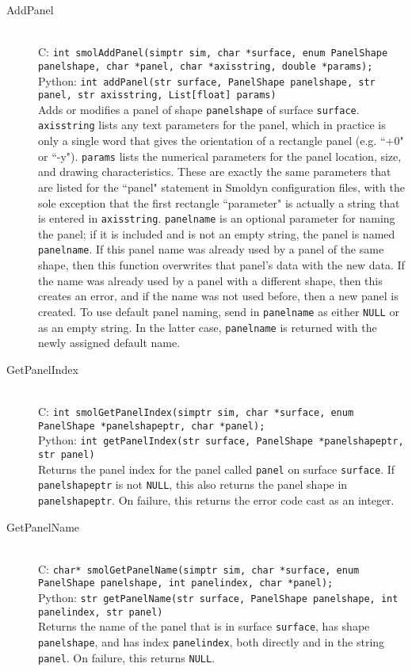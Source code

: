 \documentclass {book}
\begin{document}
\begin{description}
\item[AddPanel]
\hfill \\
C: \texttt{int smolAddPanel(simptr sim, char *surface, enum PanelShape panelshape, char *panel, char *axisstring, double *params);}\\
Python: \texttt{int addPanel(str surface, PanelShape panelshape, str panel, str axisstring, List[float] params)}\\
Adds or modifies a panel of shape \texttt{panelshape} of surface \texttt{surface}. \texttt{axisstring} lists any text parameters for the panel, which in practice is only a single word that gives the orientation of a rectangle panel (e.g. ``+0" or ``-y"). \texttt{params} lists the numerical parameters for the panel location, size, and drawing characteristics. These are exactly the same parameters that are listed for the ``panel" statement in Smoldyn configuration files, with the sole exception that the first rectangle ``parameter" is actually a string that is entered in \texttt{axisstring}. \texttt{panelname} is an optional parameter for naming the panel; if it is included and is not an empty string, the panel is named \texttt{panelname}. If this panel name was already used by a panel of the same shape, then this function overwrites that panel's data with the new data. If the name was already used by a panel with a different shape, then this creates an error, and if the name was not used before, then a new panel is created. To use default panel naming, send in \texttt{panelname} as either \texttt{NULL} or as an empty string. In the latter case, \texttt{panelname} is returned with the newly assigned default name.

\item[GetPanelIndex]
\hfill \\
C: \texttt{int smolGetPanelIndex(simptr sim, char *surface, enum PanelShape *panelshapeptr, char *panel);}\\
Python: \texttt{int getPanelIndex(str surface, PanelShape *panelshapeptr, str panel)}\\
Returns the panel index for the panel called \texttt{panel} on surface \texttt{surface}. If \texttt{panelshapeptr} is not \texttt{NULL}, this also returns the panel shape in \texttt{panelshapeptr}. On failure, this returns the error code cast as an integer.

\item[GetPanelName]
\hfill \\
C: \texttt{char* smolGetPanelName(simptr sim, char *surface, enum PanelShape panelshape, int panelindex, char *panel);}\\
Python: \texttt{str getPanelName(str surface, PanelShape panelshape, int panelindex, str panel)}\\
Returns the name of the panel that is in surface \texttt{surface}, has shape \texttt{panelshape}, and has index \texttt{panelindex}, both directly and in the string \texttt{panel}. On failure, this returns \texttt{NULL}.


\end{description}
\end{document}
